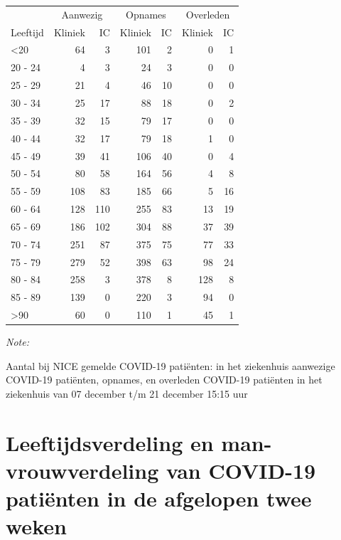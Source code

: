 \documentclass[
  english,
  man,floatsintext]{apa6}
\begin{document}
\begin{table}
\centering\begingroup\fontsize{10}{12}\selectfont

\begin{threeparttable}
\begin{tabular}{lrrrrrr}
\toprule
\multicolumn{1}{c}{ } & \multicolumn{2}{c}{Aanwezig} & \multicolumn{2}{c}{Opnames} & \multicolumn{2}{c}{Overleden} \\
\cmidrule(l{3pt}r{3pt}){2-3} \cmidrule(l{3pt}r{3pt}){4-5} \cmidrule(l{3pt}r{3pt}){6-7}
Leeftijd & Kliniek & IC & Kliniek & IC & Kliniek & IC\\
\midrule
<20 & 64 & 3 & 101 & 2 & 0 & 1\\
20 - 24 & 4 & 3 & 24 & 3 & 0 & 0\\
25 - 29 & 21 & 4 & 46 & 10 & 0 & 0\\
30 - 34 & 25 & 17 & 88 & 18 & 0 & 2\\
35 - 39 & 32 & 15 & 79 & 17 & 0 & 0\\
40 - 44 & 32 & 17 & 79 & 18 & 1 & 0\\
45 - 49 & 39 & 41 & 106 & 40 & 0 & 4\\
50 - 54 & 80 & 58 & 164 & 56 & 4 & 8\\
55 - 59 & 108 & 83 & 185 & 66 & 5 & 16\\
60 - 64 & 128 & 110 & 255 & 83 & 13 & 19\\
65 - 69 & 186 & 102 & 304 & 88 & 37 & 39\\
70 - 74 & 251 & 87 & 375 & 75 & 77 & 33\\
75 - 79 & 279 & 52 & 398 & 63 & 98 & 24\\
80 - 84 & 258 & 3 & 378 & 8 & 128 & 8\\
85 - 89 & 139 & 0 & 220 & 3 & 94 & 0\\
>90 & 60 & 0 & 110 & 1 & 45 & 1\\
\bottomrule
\end{tabular}
\begin{tablenotes}
\item \textit{Note: } 
\item Aantal bij NICE gemelde COVID-19 patiënten: in het ziekenhuis aanwezige COVID-19 patiënten, opnames, en overleden COVID-19 patiënten in het ziekenhuis van 07 december t/m 21 december 15:15 uur
\end{tablenotes}
\end{threeparttable}
\endgroup{}
\end{table}

\newpage

\hypertarget{leeftijdsverdeling-en-man-vrouwverdeling-van-covid-19-patiuxebnten-in-de-afgelopen-twee-weken}{%
\section{Leeftijdsverdeling en man-vrouwverdeling van COVID-19 patiënten in de afgelopen twee weken}\label{leeftijdsverdeling-en-man-vrouwverdeling-van-covid-19-patiuxebnten-in-de-afgelopen-twee-weken}}
\end{document}
